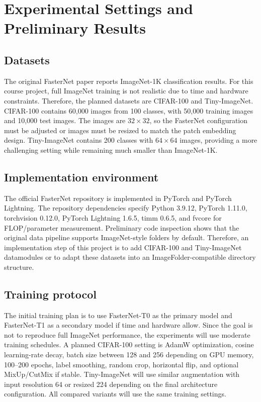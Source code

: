 \documentclass{article}
\begin{document}
\section{Experimental Settings and Preliminary Results}

\subsection{Datasets}

The original FasterNet paper reports ImageNet-1K classification results. For this course project, full ImageNet training is not realistic due to time and hardware constraints. Therefore, the planned datasets are CIFAR-100 and Tiny-ImageNet. CIFAR-100 contains 60,000 images from 100 classes, with 50,000 training images and 10,000 test images. The images are $32 \times 32$, so the FasterNet configuration must be adjusted or images must be resized to match the patch embedding design. Tiny-ImageNet contains 200 classes with $64 \times 64$ images, providing a more challenging setting while remaining much smaller than ImageNet-1K.

\subsection{Implementation environment}

The official FasterNet repository is implemented in PyTorch and PyTorch Lightning. The repository dependencies specify Python 3.9.12, PyTorch 1.11.0, torchvision 0.12.0, PyTorch Lightning 1.6.5, timm 0.6.5, and fvcore for FLOP/parameter measurement. Preliminary code inspection shows that the original data pipeline supports ImageNet-style folders by default. Therefore, an implementation step of this project is to add CIFAR-100 and Tiny-ImageNet datamodules or to adapt these datasets into an ImageFolder-compatible directory structure.

\subsection{Training protocol}

The initial training plan is to use FasterNet-T0 as the primary model and FasterNet-T1 as a secondary model if time and hardware allow. Since the goal is not to reproduce full ImageNet performance, the experiments will use moderate training schedules. A planned CIFAR-100 setting is AdamW optimization, cosine learning-rate decay, batch size between 128 and 256 depending on GPU memory, 100--200 epochs, label smoothing, random crop, horizontal flip, and optional MixUp/CutMix if stable. Tiny-ImageNet will use similar augmentation with input resolution 64 or resized 224 depending on the final architecture configuration. All compared variants will use the same training settings.
\end{document}
